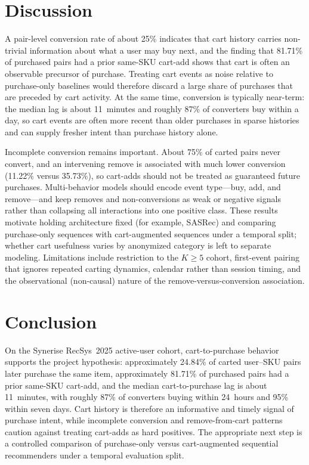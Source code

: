 \documentclass[11pt]{article}
\begin{document}
\section{Discussion}
A pair-level conversion rate of about 25\% indicates that cart history carries non-trivial information about what a user may buy next, and the finding that 81.71\% of purchased pairs had a prior same-SKU cart-add shows that cart is often an observable precursor of purchase. Treating cart events as noise relative to purchase-only baselines would therefore discard a large share of purchases that are preceded by cart activity. At the same time, conversion is typically near-term: the median lag is about 11~minutes and roughly 87\% of converters buy within a day, so cart events are often more recent than older purchases in sparse histories and can supply fresher intent than purchase history alone.

Incomplete conversion remains important. About 75\% of carted pairs never convert, and an intervening remove is associated with much lower conversion (11.22\% versus 35.73\%), so cart-adds should not be treated as guaranteed future purchases. Multi-behavior models should encode event type---buy, add, and remove---and keep removes and non-conversions as weak or negative signals rather than collapsing all interactions into one positive class. These results motivate holding architecture fixed (for example, SASRec) and comparing purchase-only sequences with cart-augmented sequences under a temporal split; whether cart usefulness varies by anonymized category is left to separate modeling. Limitations include restriction to the $K\geq 5$ cohort, first-event pairing that ignores repeated carting dynamics, calendar rather than session timing, and the observational (non-causal) nature of the remove-versus-conversion association.

\section{Conclusion}
On the Synerise RecSys~2025 active-user cohort, cart-to-purchase behavior supports the project hypothesis: approximately 24.84\% of carted user--SKU pairs later purchase the same item, approximately 81.71\% of purchased pairs had a prior same-SKU cart-add, and the median cart-to-purchase lag is about 11~minutes, with roughly 87\% of converters buying within 24~hours and 95\% within seven days. Cart history is therefore an informative and timely signal of purchase intent, while incomplete conversion and remove-from-cart patterns caution against treating cart-adds as hard positives. The appropriate next step is a controlled comparison of purchase-only versus cart-augmented sequential recommenders under a temporal evaluation split.
\end{document}
